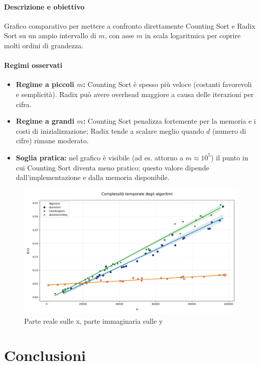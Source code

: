 \documentclass[a4paper, 11pt]{article}
\begin{document}
\paragraph{Descrizione e obiettivo}
Grafico comparativo per mettere a confronto direttamente Counting Sort e Radix Sort su un ampio intervallo di \(m\), con asse \(m\) in scala logaritmica per coprire molti ordini di grandezza.

\paragraph{Regimi osservati}
\begin{itemize}
  \item \textbf{Regime a piccoli \(m\):} Counting Sort è spesso più veloce (costanti favorevoli e semplicità). Radix può avere overhead maggiore a causa delle iterazioni per cifra.
  \item \textbf{Regime a grandi \(m\):} Counting Sort penalizza fortemente per la memoria e i costi di inizializzazione; Radix tende a scalare meglio quando \(d\) (numero di cifre) rimane moderato.
  \item \textbf{Soglia pratica:} nel grafico è visibile (ad es. attorno a \(m\approx 10^5\)) il punto in cui Counting Sort diventa meno pratico; questo valore dipende dall'implementazione e dalla memoria disponibile.
\end{itemize}

\begin{figure} [H]
    \centering
    \includegraphics[scale=0.5]{Immagini/Grafico.png}
    \caption*{Parte reale sulle x, parte immaginaria sulle y}
\end{figure}

\section{Conclusioni}
\end{document}
